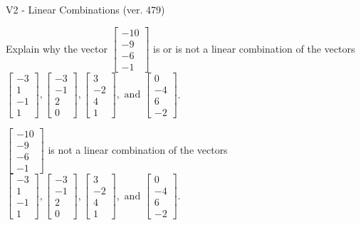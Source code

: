 \begin{exercise}
  \begin{exerciseTitle}V2 - Linear Combinations (ver. 479)\end{exerciseTitle}
  \begin{exerciseStatement}
    Explain why the vector \(\left[\begin{array}{c}
-10 \\
-9 \\
-6 \\
-1
\end{array}\right]\)  is or is not a linear 
	combination of the vectors \(\left[\begin{array}{c}
-3 \\
1 \\
-1 \\
1
\end{array}\right] , \left[\begin{array}{c}
-3 \\
-1 \\
2 \\
0
\end{array}\right] , \left[\begin{array}{c}
3 \\
-2 \\
4 \\
1
\end{array}\right] , \text{ and } \left[\begin{array}{c}
0 \\
-4 \\
6 \\
-2
\end{array}\right]\).
	


  \end{exerciseStatement}
  \begin{exerciseAnswer}
   \(\left[\begin{array}{c}
-10 \\
-9 \\
-6 \\
-1
\end{array}\right]\) 
  	 is not  
	a linear combination of the vectors \(\left[\begin{array}{c}
-3 \\
1 \\
-1 \\
1
\end{array}\right] , \left[\begin{array}{c}
-3 \\
-1 \\
2 \\
0
\end{array}\right] , \left[\begin{array}{c}
3 \\
-2 \\
4 \\
1
\end{array}\right] , \text{ and } \left[\begin{array}{c}
0 \\
-4 \\
6 \\
-2
\end{array}\right]\).


\end{exerciseAnswer}
\end{exercise}
